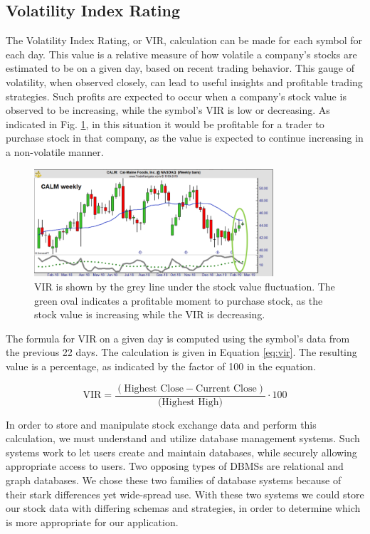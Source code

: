 \documentclass{IEEEtran}
\begin{document}
\subsection{Volatility Index Rating}

The Volatility Index Rating, or VIR, calculation can be made for each symbol for each day. This value is a relative measure of how volatile a company’s stocks are estimated to be on a given day, based on recent trading behavior. This gauge of volatility, when observed closely, can lead to useful insights and profitable trading strategies. Such profits are expected to occur when a company's stock value is observed to be increasing, while the symbol’s VIR is low or decreasing. As indicated in Fig. \ref{fig:vir_example}, in this situation it would be profitable for a trader to purchase stock in that company, as the value is expected to continue increasing in a non-volatile manner. 

\begin{figure}
	\centering
	\includegraphics[width=3.5in]{Images/vir_example.png}
	\caption{VIR is shown by the grey line under the stock value fluctuation. The green oval indicates a profitable moment to purchase stock, as the stock value is increasing while the VIR is decreasing.}
	\label{fig:vir_example}
\end{figure}

The formula for VIR on a given day is computed using the symbol's data from the previous 22 days. The calculation is given in Equation \ref{eq:vir}. The resulting value is a percentage, as indicated by the factor of 100 in the equation. 

\begin{equation}
\text{VIR} = \frac{(\text{Highest Close} - \text{Current Close})}{\text{(Highest High)}} \cdot 100 \label{eq:vir}
\end{equation}

In order to store and manipulate stock exchange data and perform this calculation, we must understand and utilize database management systems. Such systems work to let users create and maintain databases, while securely allowing appropriate access to users. Two opposing types of DBMSs are relational and graph databases. We chose these two families of database systems because of their stark differences yet wide-spread use. With these two systems we could store our stock data with differing schemas and strategies, in order to determine which is more appropriate for our application. 
\end{document}
